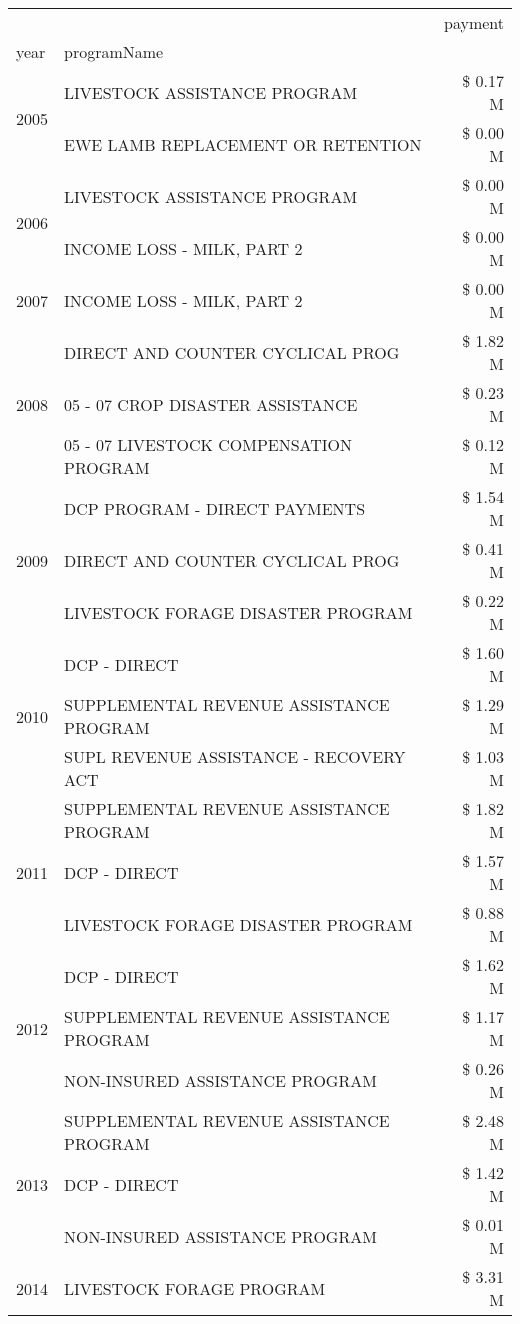 \begin{tabular}{llr}
\toprule
 &  & payment \\
year & programName &  \\
\midrule
\multirow[t]{2}{*}{2005} & LIVESTOCK ASSISTANCE PROGRAM & \$ 0.17 M \\
 & EWE LAMB REPLACEMENT OR RETENTION & \$ 0.00 M \\
\cline{1-3}
\multirow[t]{2}{*}{2006} & LIVESTOCK ASSISTANCE PROGRAM & \$ 0.00 M \\
 & INCOME LOSS - MILK, PART 2 & \$ 0.00 M \\
\cline{1-3}
2007 & INCOME LOSS - MILK, PART 2 & \$ 0.00 M \\
\cline{1-3}
\multirow[t]{3}{*}{2008} & DIRECT AND COUNTER CYCLICAL PROG & \$ 1.82 M \\
 & 05 - 07 CROP DISASTER ASSISTANCE & \$ 0.23 M \\
 & 05 - 07 LIVESTOCK COMPENSATION PROGRAM & \$ 0.12 M \\
\cline{1-3}
\multirow[t]{3}{*}{2009} & DCP PROGRAM - DIRECT PAYMENTS & \$ 1.54 M \\
 & DIRECT AND COUNTER CYCLICAL PROG & \$ 0.41 M \\
 & LIVESTOCK FORAGE DISASTER  PROGRAM & \$ 0.22 M \\
\cline{1-3}
\multirow[t]{3}{*}{2010} & DCP - DIRECT & \$ 1.60 M \\
 & SUPPLEMENTAL REVENUE ASSISTANCE PROGRAM & \$ 1.29 M \\
 & SUPL REVENUE ASSISTANCE - RECOVERY ACT & \$ 1.03 M \\
\cline{1-3}
\multirow[t]{3}{*}{2011} & SUPPLEMENTAL REVENUE ASSISTANCE PROGRAM & \$ 1.82 M \\
 & DCP - DIRECT & \$ 1.57 M \\
 & LIVESTOCK FORAGE DISASTER PROGRAM & \$ 0.88 M \\
\cline{1-3}
\multirow[t]{3}{*}{2012} & DCP - DIRECT & \$ 1.62 M \\
 & SUPPLEMENTAL REVENUE ASSISTANCE PROGRAM & \$ 1.17 M \\
 & NON-INSURED ASSISTANCE PROGRAM & \$ 0.26 M \\
\cline{1-3}
\multirow[t]{3}{*}{2013} & SUPPLEMENTAL REVENUE ASSISTANCE PROGRAM & \$ 2.48 M \\
 & DCP - DIRECT & \$ 1.42 M \\
 & NON-INSURED ASSISTANCE PROGRAM & \$ 0.01 M \\
\cline{1-3}
\multirow[t]{3}{*}{2014} & LIVESTOCK FORAGE PROGRAM & \$ 3.31 M \\

\end{tabular}
